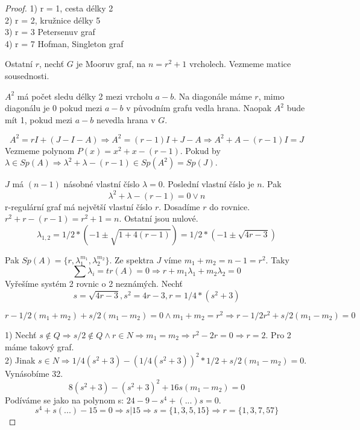 \begin{proof}
	1) r = 1, cesta délky 2\\
	2) r = 2, kružnice délky 5\\
	3) r = 3 Petersenuv graf\\
	4) r = 7 Hofman, Singleton graf

	Ostatní $r$, nechť $G$ je Mooruv graf, na $n = r^2 + 1$ vrcholech. Vezmeme matice sousednosti.

	$A^2$ má počet sledu délky 2 mezi vrcholu $a - b$.
	Na diagonále máme $r$, mimo diagonálu je 0 pokud mezi $a - b$ v původním grafu vedla hrana.
	Naopak $A^2$ bude mít 1, pokud mezi $a - b$ nevedla hrana v $G$.

	\[A^2 = rI + (J - I - A) \Rightarrow A^2 = (r - 1) I + J - A \Rightarrow A^2 + A - (r - 1)I = J \]
	Vezmeme polynom $P(x) = x^2 + x - (r-1)$. Pokud by $\lambda \in Sp(A) \Rightarrow \lambda^2 + \lambda - (r - 1) \in Sp(A^2) = Sp(J)$.

	$J$ má $(n-1)$ násobné vlastní číslo $\lambda = 0$. Poslední vlastní číslo je $n$. Pak
	\[ \lambda^2 + \lambda - (r - 1) = 0 \lor n \]
	r-regulární graf má největší vlastní číslo $r$. Dosadíme $r$ do rovnice. $ r^2 + r - (r - 1) = r^2 + 1 = n $.
	Ostatní jsou nulové.
	\[ \lambda_{1,2} = 1/2 * (-1 \pm \sqrt{1 + 4 (r-1)}) = 1/2 * (-1 \pm \sqrt{4r - 3}) \]

	Pak $ Sp(A) = \{ r, \lambda_1^{m_1}, \lambda_2^{m_2} \} $. Ze spektra $J$ víme $m_1 + m_2 = n-1 = r^2$. Taky
	\[ \sum \lambda_i = tr(A) = 0 \Rightarrow r + m_1 \lambda_1 + m_2 \lambda_2 = 0 \]
	Vyřešíme systém 2 rovnic o 2 neznámých. Nechť
	\[s = \sqrt{4r - 3}, s^2 = 4r - 3, r = 1/4 * (s^2 + 3)\]

	\[ r -1/2 (m_1 + m_2) + s/2 (m_1 - m_2) = 0 \land m_1 + m_2 = r^2 \Rightarrow r - 1/2 r^2 + s/2 (m_1 - m_2) = 0 \]

	1) Nechť $s \notin Q \Rightarrow s/2 \notin Q \land r \in N \Rightarrow m_1 = m_2 \Rightarrow r^2 - 2r = 0 \Rightarrow r = 2$. Pro 2 máme takový graf.\\
	2) Jinak $ s \in N \Rightarrow 1/4 (s^2 + 3) - (1/4 (s^2 + 3))^2 * 1/2 + s/2 (m_1 - m_2) = 0$. Vynásobíme 32.
	\[ 8(s^2 + 3) - (s^2 + 3)^2 + 16s(m_1 - m_2) = 0 \]
	Podíváme se jako na polynom s: $24 - 9 - s^4 + (...) s = 0$.
	\[ s^4 + s(...) - 15 = 0 \Rightarrow s | 15 \Rightarrow s = \{ 1, 3, 5, 15 \} \Rightarrow r = \{1, 3, 7, 57 \} \]
\end{proof}
